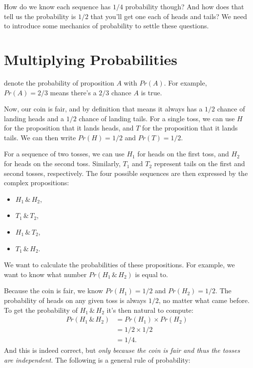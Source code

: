 \documentclass[justified]{tufte-book}
\providecommand{\tightlist}{%
  \setlength{\itemsep}{0pt}\setlength{\parskip}{0pt}}
\theoremstyle{definition}
\theoremstyle{definition}
\theoremstyle{definition}
\theoremstyle{remark}
\begin{document}
How do we know each sequence has \(1/4\) probability though? And how does that tell us the probability is \(1/2\) that you'll get one each of heads and tails? We need to introduce some mechanics of probability to settle these questions.

\hypertarget{multiplying-probabilities}{%
\section{Multiplying Probabilities}\label{multiplying-probabilities}}

 denote the probability of proposition \(A\) with \(Pr(A)\). For example, \(Pr(A)=2/3\) means there's a \(2/3\) chance \(A\) is true.

Now, our coin is fair, and by definition that means it always has a \(1/2\) chance of landing heads and a \(1/2\) chance of landing tails. For a single toss, we can use \(H\) for the proposition that it lands heads, and \(T\) for the proposition that it lands tails. We can then write \(Pr(H) = 1/2\) and \(Pr(T) = 1/2\).

For a sequence of two tosses, we can use \(H_1\) for heads on the first toss, and \(H_2\) for heads on the second toss. Similarly, \(T_1\) and \(T_2\) represent tails on the first and second tosses, respectively. The four possible sequences are then expressed by the complex propositions:

\begin{itemize}
\tightlist
\item
  \(H_1 \,\&\, H_2\),
\item
  \(T_1 \,\&\, T_2\),
\item
  \(H_1 \,\&\, T_2\),
\item
  \(T_1 \,\&\, H_2\).
\end{itemize}

We want to calculate the probabilities of these propositions. For example, we want to know what number \(Pr(H_1 \,\&\, H_2)\) is equal to.

Because the coin is fair, we know \(Pr(H_1) = 1/2\) and \(Pr(H_2) = 1/2\). The probability of heads on any given toss is always \(1/2\), no matter what came before. To get the probability of \(H_1 \,\&\, H_2\) it's then natural to compute:
\[
  \begin{aligned}
    Pr(H_1 \,\&\, H_2) &= Pr(H_1) \times Pr(H_2)\\
                       &= 1/2 \times 1/2\\
                       &= 1/4.
  \end{aligned}
\]
And this is indeed correct, but \emph{only because the coin is fair and thus the tosses are independent}. The following is a general rule of probability:
\end{document}
